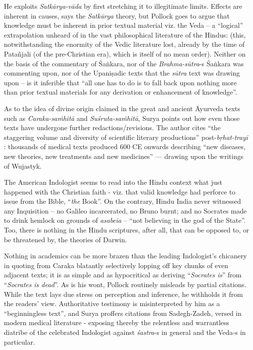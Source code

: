 He exploits {\sl Satkārya-vāda} by first stretching it to illegitimate limits. Effects are inherent in causes, says the {\sl Satkārya} theory, but Pollock goes to argue that knowledge must be inherent in prior textual material viz. the Veda -- a “logical” extrapolation unheard of in the vast philosophical literature of the Hindus: (this, notwithstanding the enormity of the Vedic literature lost, already by the time of Patañjali (of the pre-Christian era), which is itself of no mean order). Neither on the basis of the commentary of Śaṅkara, nor of the \hbox{{\sl Brahma-sūtra}-s} Śaṅkara was commenting upon, nor of the Upaniṣadic texts that the {\sl sūtra} text was drawing upon -- is it inferible that “all one has to do is to fall back upon nothing more than prior textual materials for any derivation or enhancement of knowledge”.

As to the idea of divine origin claimed in the great and ancient Āyurveda texts such as {\sl Caraka-saṁhitā} and {\sl Suśruta-saṁhitā}, Surya points out how even those texts have undergone further redactions/revisions. The author cites “the staggering volume and diversity of scientific literary productions” post-{\sl bṛhat-trayī} : thousands of medical texts produced 600 CE onwards describing “new diseases, new theories, new treatments and new medicines” --- drawing upon the writings of Wujastyk.

The American Indologist seems to read into the Hindu context what just happened with the Christian faith - viz. that valid knowledge had perforce to issue from the Bible, “{\sl the} Book”. On the contrary, Hindu India never witnessed any Inquisition -- no Galileo incarcerated, no Bruno burnt; and no Socrates made to drink hemlock on grounds of {\sl asabeia} -- “not believing in the god of the State”. Too, there is nothing in the Hindu scriptures, after all, that can be opposed to, or be threatened by, the theories of Darwin.

Nothing in academics can be more brazen than the leading Indologist’s chicanery in quoting from Caraka blatantly selectively lopping off key chunks of even adjacent texts; it is as simple and as hypocritical as deriving “{\sl Socrates is}” from “{\sl Socrates is dead}”. As is his wont, Pollock routinely misleads by partial citations. While the text lays due stress on perception and inference, he withholds it from the readers’ view. Authoritative testimony is misinterpreted by him as a “beginningless text”, and Surya proffers citations from Sadegh-Zadeh, versed in modern medical literature - exposing thereby the relentless and warrantless diatribe of the celebrated Indologist against {\sl śastra}-s in general and the Veda-s in particular.
\vskip 6pt

